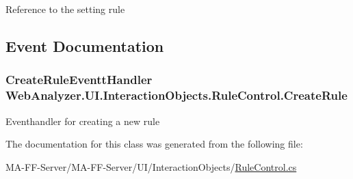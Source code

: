 Reference to the setting rule 



\subsection{Event Documentation}
\hypertarget{class_web_analyzer_1_1_u_i_1_1_interaction_objects_1_1_rule_control_a7bf67a13195858fc69b81997bb629ec5}{}
\subsubsection[{Create\+Rule}]{\setlength{\rightskip}{0pt plus 5cm}Create\+Rule\+Eventt\+Handler Web\+Analyzer.\+U\+I.\+Interaction\+Objects.\+Rule\+Control.\+Create\+Rule}\label{class_web_analyzer_1_1_u_i_1_1_interaction_objects_1_1_rule_control_a7bf67a13195858fc69b81997bb629ec5}


Eventhandler for creating a new rule 



The documentation for this class was generated from the following file\+:\begin{DoxyCompactItemize}
\item 
M\+A-\/\+F\+F-\/\+Server/\+M\+A-\/\+F\+F-\/\+Server/\+U\+I/\+Interaction\+Objects/\hyperlink{_rule_control_8cs}{Rule\+Control.\+cs}\end{DoxyCompactItemize}
